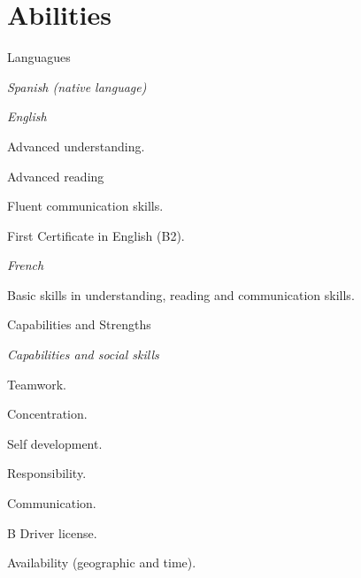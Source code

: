 \section{Abilities}
%
Languagues
\begin{outerlist}

\item[] \textit{Spanish (native language)}%

\item[]  \textit{English}%
        \begin{innerlist}
        \item Advanced understanding.
        \item Advanced reading 
		\item Fluent communication skills.
        \item First Certificate in English (B2). 
        \end{innerlist}
        
\item[]  \textit{French}%
        \begin{innerlist}
        \item Basic skills in understanding, reading and communication skills.
        \end{innerlist}

\end{outerlist}%

\halfblankline

Capabilities and Strengths
\begin{outerlist}

\item[] \textit{Capabilities and social skills}%
		\begin{innerlist}
        \item Teamwork.
        \item Concentration.
        \item Self development.
        \item Responsibility.
        \item Communication.
	    \end{innerlist}

        \begin{innerlist}
        \item B Driver license.
        \item Availability (geographic and time).
        \end{innerlist}
\end{outerlist}%

